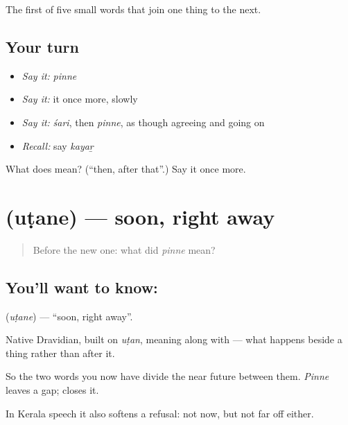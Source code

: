 \begin{grammarlens}[title={What you've built}]
The first of five small words that join one thing to the next.
\end{grammarlens}

\subsection*{Your turn}
\begin{itemize}
\raggedright
  \item \emph{Say it:} \emph{pinne}
  \item \emph{Say it:} it once more, slowly
  \item \emph{Say it:} \emph{śari}, then \emph{pinne}, as though agreeing and going on
  \item \emph{Recall:} say \emph{kayaṟ}
\end{itemize}

\begin{tcolorbox}[breakable,colback=teal!4,colframe=teal!35!black,title={Before you move on}]
What does  mean? (\textquotedblleft{}then, after that\textquotedblright{}.) Say it once more.
\end{tcolorbox}
\section[\texorpdfstring{\ml{ഉടനെ} (uṭane)}{ഉടനെ (uṭane)}]{ (uṭane) — soon, right away}

\label{lesson:ML-C64-soon}



\begin{quote}
Before the new one: what did \emph{pinne} mean?
\end{quote}

\subsection*{You'll want to know: }
\textbf{} (\emph{uṭane}) — \textquotedblleft{}soon, right away\textquotedblright{}.

Native Dravidian, built on \emph{uṭan}, meaning along with — what happens beside a thing rather than after it.

So the two words you now have divide the near future between them. \emph{Pinne} leaves a gap;  closes it.

In Kerala speech it also softens a refusal: not now, but not far off either.


